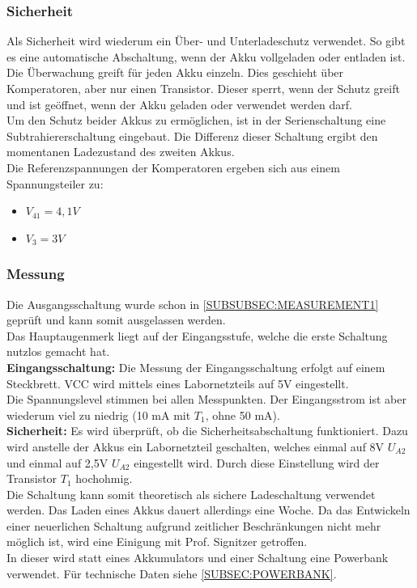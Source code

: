 \documentclass[12pt,a4paper]{article}
\begin{document}
\subsubsection{Sicherheit}
\label{SUBSUBSEC:Security2}

Als Sicherheit wird wiederum ein Über- und Unterladeschutz verwendet. So gibt es eine automatische Abschaltung, wenn der Akku vollgeladen oder entladen ist. Die Überwachung greift für jeden Akku einzeln. Dies geschieht über Komperatoren, aber nur einen Transistor. Dieser sperrt, wenn der Schutz greift und ist geöffnet, wenn der Akku geladen oder verwendet werden darf. \\
Um den Schutz beider Akkus zu ermöglichen, ist in der Serienschaltung eine Subtrahiererschaltung eingebaut. Die Differenz dieser Schaltung ergibt den momentanen Ladezustand des zweiten Akkus.\\
Die Referenzspannungen der Komperatoren ergeben sich aus einem Spannungsteiler zu:
\begin{itemize}
	\item{$V_{41} = 4,1V$}
	\item{$V_3 = 3V$}
\end{itemize}
\subsubsection{Messung}
\label{SUBSUBSEC:MEASUREMENT2}

Die Ausgangsschaltung wurde schon in \ref{SUBSUBSEC:MEASUREMENT1} geprüft und kann somit ausgelassen werden.  \\
Das Hauptaugenmerk liegt auf der Eingangsstufe, welche die erste Schaltung nutzlos gemacht hat. \\[1ex]
\textbf{Eingangsschaltung: }Die Messung der Eingangsschaltung erfolgt auf einem Steckbrett. VCC wird mittels eines Labornetzteils auf 5V eingestellt. \\
Die Spannungslevel stimmen bei allen Messpunkten. Der Eingangsstrom ist aber wiederum viel zu niedrig (10 mA mit $T_1$, ohne 50 mA). \\
\textbf{Sicherheit:} Es wird überprüft, ob die Sicherheitsabschaltung funktioniert. Dazu wird anstelle der Akkus ein Labornetzteil geschalten, welches einmal auf 8V $U_{A2}$ und einmal auf 2,5V $U_{A2}$ eingestellt wird. Durch diese Einstellung wird der Transistor $T_1$ hochohmig. \\
Die Schaltung kann somit theoretisch als sichere Ladeschaltung verwendet werden. Das Laden eines Akkus dauert allerdings eine Woche. Da das Entwickeln einer neuerlichen Schaltung aufgrund zeitlicher Beschränkungen nicht mehr möglich ist, wird eine Einigung mit Prof. Signitzer getroffen. \\
In dieser wird statt eines Akkumulators und einer Schaltung eine Powerbank verwendet. Für technische Daten siehe \ref{SUBSEC:POWERBANK}.
\end{document}
